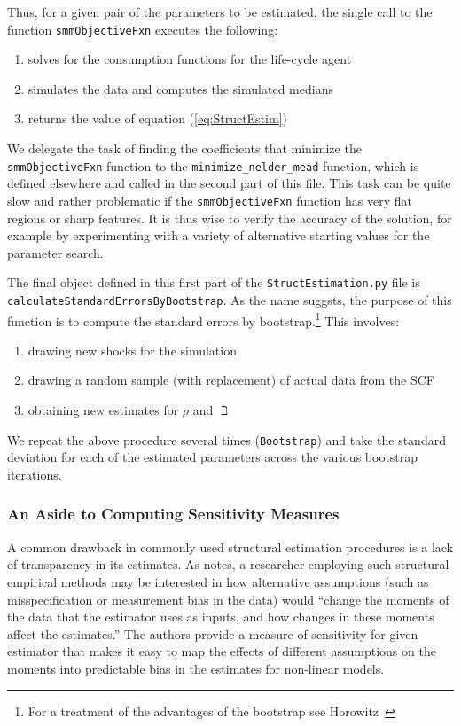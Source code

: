 \documentclass[titlepage, headings=optiontotocandhead]{Resources/texmf-local/tex/latex/econtex}
\begin{document}
Thus, for a given pair of the parameters to be estimated, the single
call to the function \texttt{smmObjectiveFxn} executes the following:
\begin{enumerate}
\item solves for the consumption functions for the life-cycle agent
\item simulates the data and computes the simulated medians
\item returns the value of equation (\ref{eq:StructEstim})
\end{enumerate}

We delegate the task of finding the coefficients that minimize the \texttt{smmObjectiveFxn} function to the \texttt{minimize\_nelder\_mead} function, which is defined elsewhere and called in the second part of this file.  This task can be quite slow and rather problematic if the \texttt{smmObjectiveFxn} function has very flat regions or sharp features. It is thus wise to verify the accuracy of the solution, for example by experimenting with a variety of alternative starting values for the parameter search.

The final object defined in this first part of the \texttt{StructEstimation.py}
file is \texttt{calculateStandardErrorsByBootstrap}. As the name suggsts, the
purpose of this function is to compute the standard errors by bootstrap.\footnote{For a
  treatment of the advantages of the bootstrap see
  Horowitz~\citeyearpar{horowitzBootstrap}} This involves:
\begin{enumerate}
\item drawing new shocks for the simulation
\item drawing a random sample (with replacement) of actual data from the SCF
\item obtaining new estimates for $\rho$ and $\beth$
\end{enumerate}
We repeat the above procedure several times (\texttt{Bootstrap}) and
take the standard deviation for each of the estimated parameters across the various bootstrap iterations.

\subsubsection{An Aside to Computing Sensitivity Measures}\label{subsubsec:sensmeas}


A common drawback in commonly used structural estimation procedures is a lack of transparency in its estimates.  As \cite{andrews2017measuring} notes, a researcher employing such structural empirical methods may be interested in how alternative assumptions (such as misspecification or measurement bias in the data) would ``change the moments of the data that the estimator uses as inputs, and how changes in these moments affect the estimates.'' The authors provide a measure of sensitivity for given estimator that makes it easy to map the effects of different assumptions on the moments into predictable bias in the estimates for non-linear models.
\end{document}
